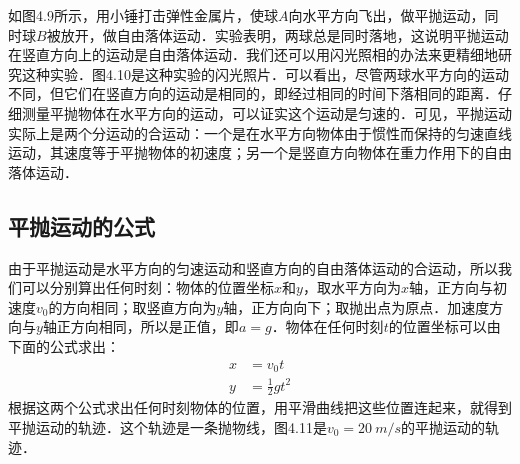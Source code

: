 如图4.9所示，用小锤打击弹性金属片，使球$A$向水平方向飞出，做平抛运动，同时球$B$被放开，做自由落体运动．实验表明，两球总是同时落地，这说明平抛运动在竖直方向上的运动是自由落体运动．我们还可以用闪光照相的办法来更精细地研究这种实验．图4.10是这种实验的闪光照片．可以看出，尽管两球水平方向的运动不同，但它们在竖直方向的运动是相同的，即经过相同的时间下落相同的距离．仔细测量平抛物体在水平方向的运动，可以证实这个运动是匀速的．可见，平抛运动实际上是两个分运动的合运动：一个是在水平方向物体由于惯性而保持的匀速直线运动，其速度等于平抛物体的初速度；另一个是竖直方向物体在重力作用下的自由落体运动．

\subsection{平抛运动的公式}

由于平抛运动是水平方向的匀速运动和竖直方向的自由落体运动的合运动，所以我们可以分别算出任何时刻：物体的位置坐标$x$和$y$，取水平方向为$x$轴，正方向与初速度$v_0$的方向相同；取竖直方向为$y$轴，正方向向下；取抛出点为原点．加速度方向与$y$轴正方向相同，所以是正值，即$a=g$．物体在任何时刻$t$的位置坐标可以由下面的公式求出：
\begin{align}
    x & =v_0 t           \\
    y & =\frac{1}{2}gt^2
\end{align}
根据这两个公式求出任何时刻物体的位置，用平滑曲线把这些位置连起来，就得到平抛运动的轨迹．这个轨迹是一条抛物线，图4.11是$v_0=\SI{20}{m/s}$的平抛运动的轨迹．
